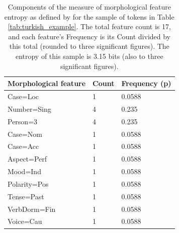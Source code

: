 \documentclass[USenglish]{article}
\begin{document}
\begin{table}[h]
    \centering
    \caption{Components of the measure of morphological feature entropy as defined by \citet{ccoltekin2023complexity} for the sample of tokens in Table \ref{tab:turkish_example}. The total feature count is 17, and each feature's Frequency is its Count divided by this total (rounded to three significant figures). The entropy of this sample is 3.15 bits (also to three significant figures).} %
    \label{tab:mfh}   
    \begin{tabular}{p{5cm}p{3cm}p{3cm}}
\toprule
	\textbf{Morphological feature}	&	\textbf{Count}	&	\textbf{Frequency (p)}	\\
    \midrule
	Case=Loc&1&0.0588       \\    \midrule
	Number=Sing&4&0.235    \\    \midrule
        Person=3&4&0.235		   \\    \midrule
	Case=Nom&1&0.0588	       \\    \midrule
	Case=Acc&1&0.0588		      \\    \midrule
        Aspect=Perf&1&0.0588      \\    \midrule
        Mood=Ind&1&0.0588		   \\    \midrule
        Polarity=Pos&1&0.0588		\\    \midrule
	Tense=Past&1&0.0588	     \\    \midrule
	VerbDorm=Fin&1&0.0588	    \\    \midrule
	Voice=Cau&1&0.0588      	\\ \bottomrule

    \end{tabular}
\end{table}
\end{document}
